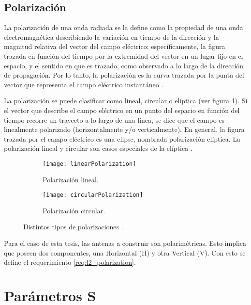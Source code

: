 \subsection{Polarización} \label{sc:polarization}

La polarización de una onda radiada se la define como la propiedad de una onda electromagnética describiendo la variación en tiempo de la dirección y la magnitud relativa del vector del campo eléctrico; específicamente, la figura trazada en función del tiempo por la extremidad del vector en un lugar fijo en el espacio, y el sentido en que es trazado, como observado a lo largo de la dirección de propagación. Por lo tanto, la polarización es la curva trazada por la punta del vector que representa el campo eléctrico instantáneo \cite{Balanis2012}.

La polarización se puede clasificar como lineal, circular o elíptica (ver figura \ref{fig:hvPolarizations}). Si el vector que describe el campo eléctrico en un punto del espacio en función del tiempo recorre un trayecto a lo largo de una línea, se dice que el campo es linealmente polarizado (horizontalmente y/o verticalmente). En general, la figura trazada por el campo eléctrico es una elipse, nombrada polarización elíptica. La polarización lineal y circular son casos especiales de la elíptica \cite{Vita2012}.

\begin{figure}[H]
  \centering
  \begin{subfigure}[b]{0.49\textwidth}
    \texttt{[image: linearPolarization]}
    \caption{Polarización lineal.}
  \end{subfigure}
  \begin{subfigure}[b]{0.49\textwidth}
    \texttt{[image: circularPolarization]}
    \caption{Polarización circular.}
  \end{subfigure}
  \caption{Distintos tipos de polarizaciones \cite{Hecht2002}.}
  \label{fig:hvPolarizations}
\end{figure}

Para el caso de esta tesis, las antenas a construir son polarimétricas. Esto implica que poseen dos componentes, una Horizontal (H) y otra Vertical (V). Con esto se define el requerimiento \ref{req:l2_polarization}.


\section{Parámetros S} 


